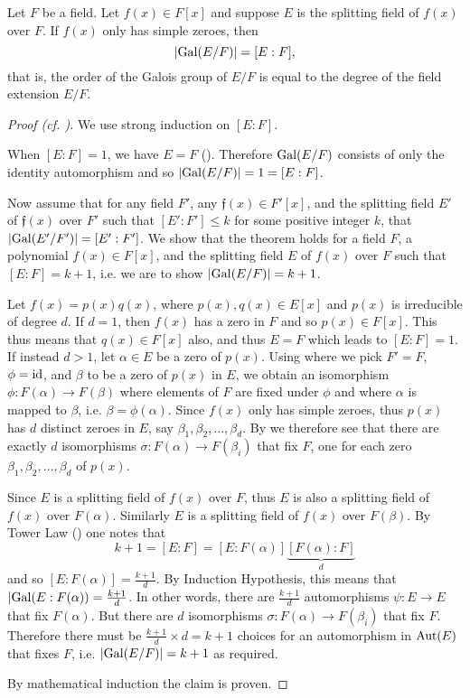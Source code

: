 \begin{theorem}\label{thrm-order-of-galois-group-is-degree-of-field-extension}
    Let $F$ be a field. Let $f(x) \in F[x]$ and suppose $E$ is the splitting field of $f(x)$ over $F$. If $f(x)$ only has simple zeroes, then
    \[
        |\mathrm{Gal}(E/F)| = [E:F],
    \]
    that is, the order of the Galois group of $E/F$ is equal to the degree of the field extension $E/F$.
\end{theorem}
\begin{proof}[Proof (cf. {\cite[Theorem 23.7]{judson_beezer_2022}})]
    We use strong induction on $[E:F]$.

    When $[E:F] = 1$, we have $E = F$ (). Therefore $\mathrm{Gal}(E/F)$ consists of only the identity automorphism and so $|\mathrm{Gal}(E/F)| = 1 = [E:F]$.

    Now assume that for any field $F'$, any $\mathfrak{f}(x) \in F'[x]$, and the splitting field $E'$ of $\mathfrak{f}(x)$ over $F'$ such that $[E':F'] \leq k$ for some positive integer $k$, that $|\mathrm{Gal}(E'/F')| = [E':F']$. We show that the theorem holds for a field $F$, a polynomial $f(x) \in F[x]$, and the splitting field $E$ of $f(x)$ over $F$ such that $[E:F] = k+1$, i.e. we are to show $|\mathrm{Gal}(E/F)| = k + 1$.

    Let $f(x) = p(x)q(x)$, where $p(x), q(x) \in E[x]$ and $p(x)$ is irreducible of degree $d$. If $d = 1$, then $f(x)$ has a zero in $F$ and so $p(x) \in F[x]$. This thus means that $q(x) \in F[x]$ also, and thus $E = F$ which leads to $[E:F] = 1$. If instead $d > 1$, let $\alpha \in E$ be a zero of $p(x)$. Using  where we pick $F' = F$, $\phi = \mathrm{id}$, and $\beta$ to be a zero of $p(x)$ in $E$, we obtain an isomorphism $\phi: F(\alpha) \to F(\beta)$ where elements of $F$ are fixed under $\phi$ and where $\alpha$ is mapped to $\beta$, i.e. $\beta = \phi(\alpha)$. Since $f(x)$ only has simple zeroes, thus $p(x)$ has $d$ distinct zeroes in $E$, say $\beta_1, \beta_2, \dots, \beta_d$. By  we therefore see that there are exactly $d$ isomorphisms $\sigma: F(\alpha) \to F(\beta_i)$ that fix $F$, one for each zero $\beta_1, \beta_2, \dots, \beta_d$ of $p(x)$.

    Since $E$ is a splitting field of $f(x)$ over $F$, thus $E$ is also a splitting field of $f(x)$ over $F(\alpha)$. Similarly $E$ is a splitting field of $f(x)$ over $F(\beta)$. By Tower Law () one notes that
    \[
        k+1 = [E:F] = [E:F(\alpha)]\underbrace{[F(\alpha):F]}_{d}
    \]
    and so $[E:F(\alpha)] = \frac{k + 1}{d}$. By Induction Hypothesis, this means that $|\mathrm{Gal}(E:F(\alpha)) = \frac{k+1}{d}$. In other words, there are $\frac{k+1}{d}$ automorphisms $\psi: E \to E$ that fix $F(\alpha)$. But there are $d$ isomorphisms $\sigma: F(\alpha) \to F(\beta_i)$ that fix $F$. Therefore there must be $\frac{k+1}{d} \times d = k+1$ choices for an automorphism in $\mathrm{Aut}(E)$ that fixes $F$, i.e. $|\mathrm{Gal}(E/F)| = k+1$ as required.

    By mathematical induction the claim is proven.
\end{proof}

